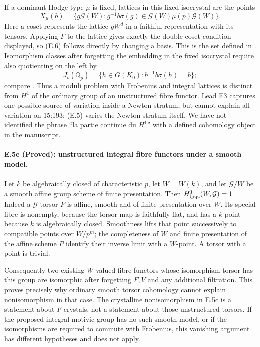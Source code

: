 If a dominant Hodge type $\mu$ is fixed, lattices in this fixed isocrystal
are the points
\[
 X_\mu(b)=\{g\mathcal G(W):
   g^{-1}b\sigma(g)\in\mathcal G(W)\mu(p)\mathcal G(W)\}.
 \tag{E.6}
\]
Here a coset represents the lattice $gW^d$ in a faithful representation
with its tensors. Applying $F$ to the lattice gives exactly the
double-coset condition displayed, so (E.6) follows directly by changing
a basis. This is the set defined in
\citet[\S1.2.9, author-PDF p.~14]{D_Kisin2017}.
Isomorphism classes after forgetting the embedding in the
fixed isocrystal require also quotienting on the left by
\[
 J_b(\mathbb Q_p)=\{h\in G(K_0):h^{-1}b\sigma(h)=b\};
\]
compare \citet[\S1.2.12, author-PDF p.~14]{D_Kisin2017}.
Thus a moduli problem with Frobenius and integral lattices is distinct
from $H^1$ of the ordinary group of an unstructured fibre functor.
Lead E3 captures one possible source of variation inside a Newton
stratum, but cannot explain all variation on 15:193: (E.5) varies the
Newton stratum itself. We have not identified the phrase
``la partie continue du $H^1$'' with a defined cohomology object in the
manuscript.

\paragraph{E.5e (Proved): unstructured integral fibre functors under a smooth model.}
Let $k$ be algebraically closed of characteristic $p$, let $W=W(k)$,
and let $\mathcal G/W$ be a smooth affine group scheme of finite
presentation. Then
$H^1_{\rm fpqc}(W,\mathcal G)=1$.
Indeed a $\mathcal G$-torsor $P$ is affine, smooth and of finite
presentation over $W$. Its special fibre is nonempty, because the
torsor map is faithfully flat, and has a $k$-point because $k$ is
algebraically closed. Smoothness lifts that point successively to
compatible points over $W/p^m$; the completeness of $W$ and finite
presentation of the affine scheme $P$ identify their inverse limit
with a $W$-point. A torsor with a point is trivial.

Consequently two existing $W$-valued fibre functors whose isomorphism
torsor has this group are isomorphic after forgetting $F,V$ and any
additional filtration. This proves precisely why ordinary smooth
torsor cohomology cannot explain nonisomorphism in that case. The
crystalline nonisomorphism in E.5c is a statement about $F$-crystals,
not a statement about those unstructured torsors. If the proposed
integral motivic group has no such smooth model, or if the
isomorphisms are required to commute with Frobenius, this vanishing
argument has different hypotheses and does not apply.

